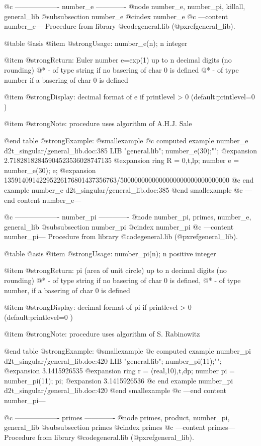 @c ------------------- number_e -------------
@node number_e, number_pi, killall, general_lib
@subsubsection number_e
@cindex number_e
@c ---content number_e---
Procedure from library @code{general.lib} (@pxref{general_lib}).

@table @asis
@item @strong{Usage:}
number_e(n); n integer

@item @strong{Return:}
Euler number e=exp(1) up to n decimal digits (no rounding)
@* - of type string if no basering of char 0 is defined
@* - of type number if a basering of char 0 is defined

@item @strong{Display:}
decimal format of e if printlevel > 0 (default:printlevel=0 )

@item @strong{Note:}
procedure uses algorithm of A.H.J. Sale

@end table
@strong{Example:}
@smallexample
@c computed example number_e d2t_singular/general_lib.doc:385 
LIB "general.lib";
number_e(30);"";
@expansion{} 2.71828182845904523536028747135
@expansion{} 
ring R = 0,t,lp;
number e = number_e(30);
e;
@expansion{} 13591409142295226176801437356763/5000000000000000000000000000000
@c end example number_e d2t_singular/general_lib.doc:385
@end smallexample
@c ---end content number_e---

@c ------------------- number_pi -------------
@node number_pi, primes, number_e, general_lib
@subsubsection number_pi
@cindex number_pi
@c ---content number_pi---
Procedure from library @code{general.lib} (@pxref{general_lib}).

@table @asis
@item @strong{Usage:}
number_pi(n); n positive integer

@item @strong{Return:}
pi (area of unit circle) up to n decimal digits (no rounding)
@* - of type string if no basering of char 0 is defined,
@* - of type number, if a basering of char 0 is defined

@item @strong{Display:}
decimal format of pi if printlevel > 0 (default:printlevel=0 )

@item @strong{Note:}
procedure uses algorithm of S. Rabinowitz

@end table
@strong{Example:}
@smallexample
@c computed example number_pi d2t_singular/general_lib.doc:420 
LIB "general.lib";
number_pi(11);"";
@expansion{} 3.1415926535
@expansion{} 
ring r = (real,10),t,dp;
number pi = number_pi(11); pi;
@expansion{} 3.1415926536
@c end example number_pi d2t_singular/general_lib.doc:420
@end smallexample
@c ---end content number_pi---

@c ------------------- primes -------------
@node primes, product, number_pi, general_lib
@subsubsection primes
@cindex primes
@c ---content primes---
Procedure from library @code{general.lib} (@pxref{general_lib}).

